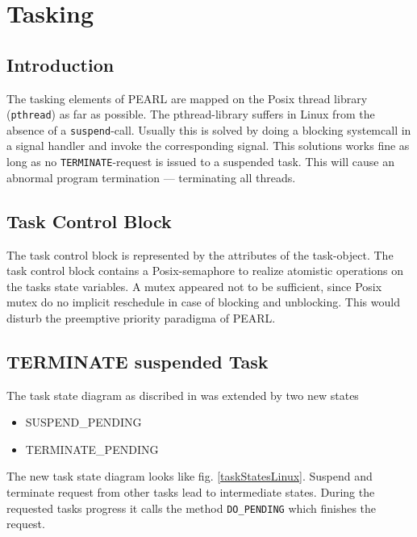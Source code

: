 \section{Tasking}


\subsection{Introduction}
The tasking elements of PEARL are mapped on the Posix thread library 
(\verb|pthread|) as far as possible. 
The pthread-library suffers in Linux from the absence of a \verb|suspend|-call.
Usually this is solved by doing a blocking systemcall in a signal handler and
invoke the corresponding signal.
This solutions works fine as long as no \verb|TERMINATE|-request is
issued to a suspended task. This will cause an abnormal program
termination --- terminating all threads. 


\subsection{Task Control Block}
The task control block is represented by the attributes of the 
task-object. 
The task control block contains a Posix-semaphore to realize atomistic
operations on the tasks state variables.
A mutex appeared not to be sufficient, since
Posix mutex do no implicit reschedule in case of blocking and unblocking.
This would disturb the preemptive priority  paradigma of PEARL.

\subsection{TERMINATE suspended Task}
The task state diagram as discribed in \cite{pearl90} was extended by two
new states 
\begin{itemize}
\item SUSPEND\_PENDING
\item TERMINATE\_PENDING
\end{itemize}
The new task state diagram looks like fig. \ref{taskStatesLinux}.
Suspend and terminate request from other tasks lead to intermediate states.
During the requested tasks progress it calls the method \verb|DO_PENDING| which
finishes the request.

